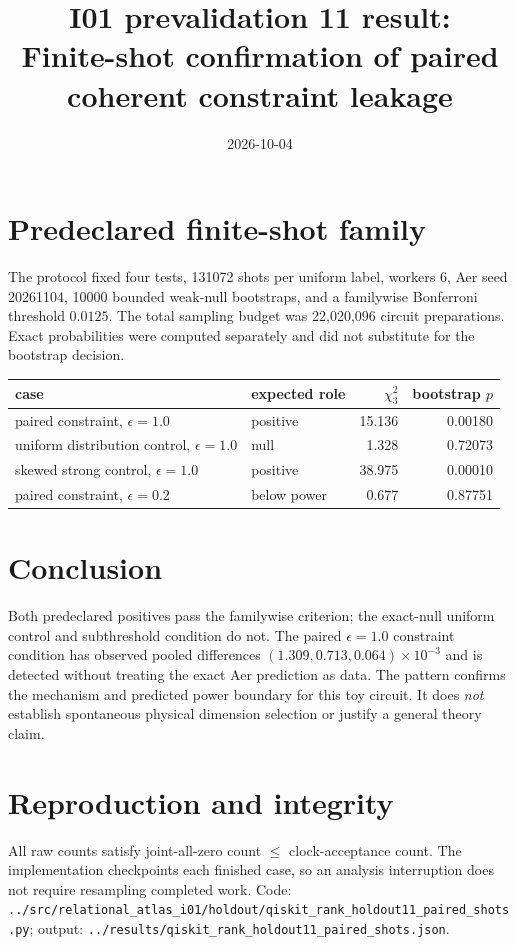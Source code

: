 \documentclass[11pt]{article}
\begin{document}
\title{I01 prevalidation 11 result:\\Finite-shot confirmation of paired coherent constraint leakage}
\date{2026-10-04}
\maketitle

\section*{Predeclared finite-shot family}
The protocol fixed four tests, 131072 shots per uniform label, workers 6, Aer seed
20261104, 10000 bounded weak-null bootstraps, and a familywise Bonferroni threshold
$0.0125$. The total sampling budget was 22,020,096 circuit preparations. Exact
probabilities were computed separately and did not substitute for the bootstrap
decision.

\begin{center}
\begin{tabular}{llrr}
\toprule
case & expected role & $\chi^2_3$ & bootstrap $p$\\
\midrule
paired constraint, $\epsilon=1.0$ & positive & 15.136 & 0.00180\\
uniform distribution control, $\epsilon=1.0$ & null & 1.328 & 0.72073\\
skewed strong control, $\epsilon=1.0$ & positive & 38.975 & 0.00010\\
paired constraint, $\epsilon=0.2$ & below power & 0.677 & 0.87751\\
\bottomrule
\end{tabular}
\end{center}

\section*{Conclusion}
Both predeclared positives pass the familywise criterion; the exact-null uniform
control and subthreshold condition do not. The paired $\epsilon=1.0$ constraint
condition has observed pooled differences $(1.309,0.713,0.064)\times10^{-3}$ and
is detected without treating the exact Aer prediction as data. The pattern confirms
the mechanism and predicted power boundary for this toy circuit. It does
\emph{not} establish spontaneous physical dimension selection or justify a general
theory claim.

\section*{Reproduction and integrity}
All raw counts satisfy joint-all-zero count $\leq$ clock-acceptance count. The
implementation checkpoints each finished case, so an analysis interruption does not
require resampling completed work. Code:
\texttt{../src/relational\_atlas\_i01/holdout/qiskit\_rank\_holdout11\_paired\_shots.py};
output: \texttt{../results/qiskit\_rank\_holdout11\_paired\_shots.json}.
\end{document}
